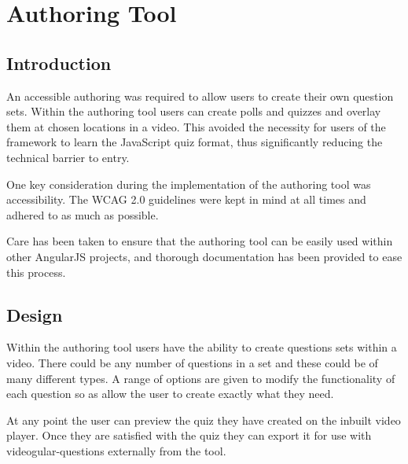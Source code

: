\chapter{Authoring Tool} 
\label{Chapter:Authoring Tool}


\section{Introduction}
\label{Section:Authoring_Introduction}

An accessible \gls{authoring} was required to allow users to create their own question sets. Within the authoring tool users can create polls and quizzes and overlay them at chosen locations in a video. This avoided the necessity for users of the framework to learn the JavaScript quiz format, thus significantly reducing the technical barrier to entry. 

One key consideration during the implementation of the authoring tool was accessibility. The \gls{WCAG} 2.0 guidelines were kept in mind at all times and adhered to as much as possible.

Care has been taken to ensure that the authoring tool can be easily used within other AngularJS projects, and thorough documentation has been provided to ease this process.

\section{Design} 
\label{Section:Authoring_Design}

Within the authoring tool users have the ability to create questions sets within a video. There could be any number of questions in a set and these could be of many different types. A range of options are given to modify the functionality of each question so as allow the user to create exactly what they need.

At any point the user can preview the quiz they have created on the inbuilt video player. Once they are satisfied with the quiz they can export it for use with videogular-questions externally from the tool.

